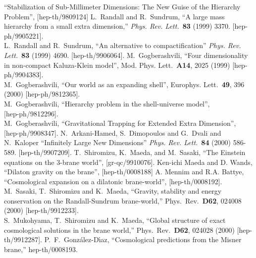 \documentclass[a4paper,10pt]{article}
\begin{document}
\begin{thebibliography}{99}
``Stabilization of Sub-Millimeter Dimensions: The New Guise 
of the Hierarchy Problem'',
[hep-th/9809124] 
L.~Randall and R.~Sundrum,
``A large mass hierarchy from a small extra dimension,''
{\it Phys.  Rev.  Lett.}\ {\bf 83} (1999) 3370. 
[hep-ph/9905221].
\\
L.~Randall and R.~Sundrum,
``An alternative to compactification''
{\it Phys.  Rev.  Lett.}\ {\bf 83} (1999) 4690.
[hep-th/9906064].
M.~Gogberashvili,
``Four dimensionality in non-compact Kaluza-Klein model'',
Mod.  Phys.  Lett.\  {\bf A14}, 2025 (1999)
[hep-ph/9904383].
\\
M.~Gogberashvili,
``Our world as an expanding shell'',
Europhys.  Lett.\  {\bf 49}, 396 (2000)
[hep-ph/9812365].
\\
M.~Gogberashvili,
``Hierarchy problem in the shell-universe model'',\\{}
[hep-ph/9812296].
\\
M.~Gogberashvili,
``Gravitational Trapping for Extended Extra Dimension'',\\{}
[hep-ph/9908347].
N.~Arkani-Hamed, S.~Dimopoulos and G.~Dvali and N.~Kaloper
``Infinitely Large New Dimensions''
{\it Phys.  Rev.  Lett.}\ {\bf 84} (2000) 586-589.
[hep-th/9907209].
T.~Shiromizu, K.~Maeda, and M.~Sasaki,
``The Einstein equations on the 3-brane world'',
[gr-qc/9910076].
Ken-ichi Maeda and D. Wands,
``Dilaton gravity on the brane'',
[hep-th/0008188]
A. Mennim and R.A. Battye,
``Cosmological expansion on a dilatonic brane-world'',
[hep-th/0008192].
M.~Sasaki, T.~Shiromizu and K.~Maeda,
``Gravity, stability and energy conservation on the Randall-Sundrum  brane-world,''
Phys.\ Rev.\  {\bf D62}, 024008 (2000)
[hep-th/9912233].
\\
S.~Mukohyama, T.~Shiromizu and K.~Maeda,
``Global structure of exact cosmological solutions in the brane world,''
Phys.\ Rev.\  {\bf D62}, 024028 (2000)
[hep-th/9912287].
P.~F.~Gonz\'alez-D\'\i{}az,
``Cosmological predictions from the Misner brane,''
hep-th/0008193.

\end{thebibliography}
\end{document}
